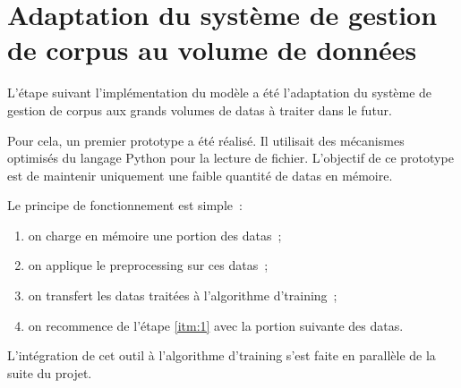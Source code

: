 \section{Adaptation du système de gestion de corpus au volume de données}
L'étape suivant l'implémentation du modèle a été l'adaptation du système de gestion de corpus aux grands volumes de \glspl{data} à traiter dans le futur.

Pour cela, un premier prototype a été réalisé.
Il utilisait des mécanismes optimisés du langage Python pour la lecture de fichier.
L'objectif de ce prototype est de maintenir uniquement une faible quantité de \glspl{data} en mémoire.

Le principe de fonctionnement est simple~:
\begin{enumerate}
	\item on charge en mémoire une portion des \glspl{data}~; \label{itm:1}
	\item on applique le \gls{preprocessing} sur ces \glspl{data}~;
	\item on transfert les \glspl{data} traitées à l'algorithme d'\gls{training}~;
	\item on recommence de l'étape \ref{itm:1} avec la portion suivante des \glspl{data}.
\end{enumerate}
\vspace{1em}

L'intégration de cet outil à l'algorithme d'\gls{training} s'est faite en parallèle de la suite du projet.